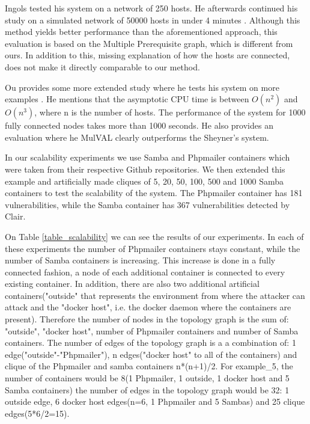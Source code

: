 Ingols tested his system on a network of 250 hosts. He afterwards continued his study on a simulated network of 50000 hosts in under 4 minutes \cite{ingols2006practical}. Although this method yields better performance than the aforementioned approach, this evaluation is based on the Multiple Prerequisite graph, which is different from ours. In addition to this, missing explanation of how the hosts are connected, does not make it directly comparable to our method.

Ou provides some more extended study where he tests his system on more examples \cite{ou2006scalable}. He mentions that the asymptotic CPU time is between $O(n^2)$ and $O(n^3)$, where n is the number of hosts. The performance of the system for 1000 fully connected nodes takes more than 1000 seconds. He also provides an evaluation where he MulVAL clearly outperforms the Sheyner's system.

In our scalability experiments we use Samba \cite{samba} and Phpmailer \cite{phpmailer} containers which were taken from their respective Github repositories. We then extended this example and artificially made cliques of 5, 20, 50, 100, 500 and 1000 Samba containers to test the scalability of the system. The Phpmailer container has 181 vulnerabilities, while the Samba container has 367 vulnerabilities detected by Clair.

On Table \ref{table_scalability} we can see the results of our experiments. In each of these experiments the number of Phpmailer containers stays constant, while the number of Samba containers is increasing. This increase is done in a fully connected fashion, a node of each additional container is connected to every existing container. In addition, there are also two additional artificial containers("outside" that represents the environment from where the attacker can attack and the "docker host", i.e. the docker daemon where the containers are present). Therefore the number of nodes in the topology graph is the sum of: "outside", "docker host", number of Phpmailer containers and number of Samba containers. The number of edges of the topology graph is a a combination of: 1 edge("outside"-"Phpmailer"), n edges("docker host" to all of the containers) and clique of the Phpmailer and samba containers n*(n+1)/2. For example\_5, the number of containers would be 8(1 Phpmailer, 1 outside, 1 docker host and 5 Samba containers) the number of edges in the topology graph would be 32: 1 outside edge, 6 docker host edges(n=6, 1 Phpmailer and 5 Sambas) and 25 clique edges(5*6/2=15).

